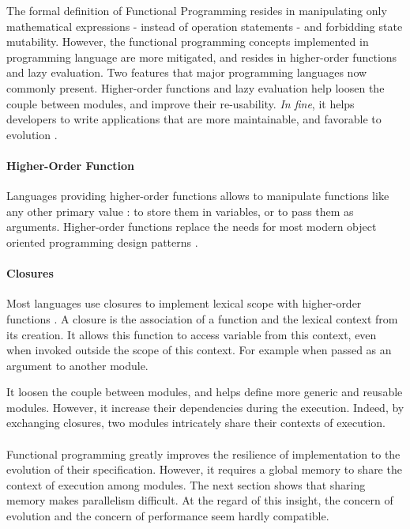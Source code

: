 
The formal definition of Functional Programming resides in manipulating only mathematical expressions - instead of operation statements - and forbidding state mutability.
However, the functional programming concepts implemented in programming language are more mitigated, and resides in higher-order functions and lazy evaluation.
Two features that major programming languages now commonly present.
Higher-order functions and lazy evaluation help loosen the couple between modules, and improve their re-usability.
\textit{In fine}, it helps developers to write applications that are more maintainable, and favorable to evolution \cite{Hughes1989}.

\paragraph{Higher-Order Function}

Languages providing higher-order functions allows to manipulate functions like any other primary value : to store them in variables, or to pass them as arguments.
Higher-order functions replace the needs for most modern object oriented programming design patterns .

\paragraph{Closures}

Most languages use closures to implement lexical scope with higher-order functions \cite{Sussman1998}.
A closure is the association of a function and the lexical context from its creation.
It allows this function to access variable from this context, even when invoked outside the scope of this context.
For example when passed as an argument to another module.

It loosen the couple between modules, and helps define more generic and reusable modules.
However, it increase their dependencies during the execution.
Indeed, by exchanging closures, two modules intricately share their contexts of execution.

\paragraph{}

Functional programming greatly improves the resilience of implementation to the evolution of their specification.
However, it requires a global memory to share the context of execution among modules.
The next section shows that sharing memory makes parallelism difficult.
At the regard of this insight, the concern of evolution and the concern of performance seem hardly compatible.



